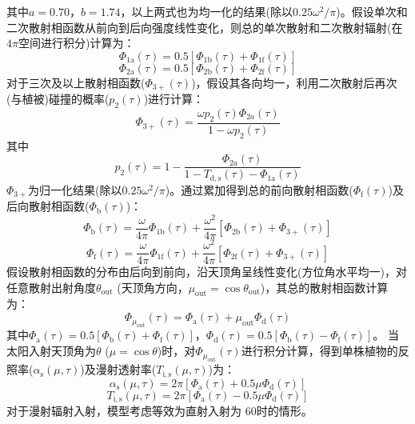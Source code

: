 其中$a=0.70$，$b=1.74$，以上两式也为均一化的结果(除以$0.25\omega^2/\pi$)。假设单次和二次散射相函数从前向到后向强度线性变化，则总的单次散射和二次散射辐射(在$4\pi$空间进行积分)计算为：
\begin{equation}
  \Phi_{\mathrm{1 a}}(\tau)=0.5\left[\Phi_{\mathrm{1 b}}(\tau)+\Phi_{\mathrm{1 f}}(\tau)\right]
\end{equation}
\begin{equation}
  \Phi_{\mathrm{2 a}}(\tau)=0.5\left[\Phi_{\mathrm{2 b}}(\tau)+\Phi_{\mathrm{2 f}}(\tau)\right]
\end{equation}
对于三次及以上散射相函数($\Phi_{3+}\left(\tau\right)$)，假设其各向均一，利用二次散射后再次(与植被)碰撞的概率($p_2\left(\tau\right)$)进行计算：
\begin{equation}
  \Phi_{3+}(\tau)=\frac{\omega p_{2}(\tau) \Phi_{2 a}(\tau)}{1-\omega p_{2}(\tau)}
\end{equation}
其中
\begin{equation}
  p_{2}(\tau)=1-\frac{\Phi_{2 a}(\tau)}{1-T_{\mathrm{d, s}}(\tau)-\Phi_{\mathrm{1 a}}(\tau)}
\end{equation}
$\Phi_{3+}$为归一化结果(除以$0.25\omega^2/\pi$)。通过累加得到总的前向散射相函数($\Phi_{\mathrm {f}}\left(\tau\right)$)及后向散射相函数($\Phi_{\mathrm {b}}\left(\tau\right)$)：
\begin{equation}
  \Phi_{\mathrm{b}}(\tau)=\frac{\omega}{4 \pi} \Phi_{\mathrm{1 b}}(\tau)+\frac{\omega^{2}}{4 \pi}\left[\Phi_{\mathrm{2 b}}(\tau)+\Phi_{3+}(\tau)\right]
\end{equation}
\begin{equation}
  \Phi_{\mathrm{f}}(\tau)=\frac{\omega}{4 \pi} \Phi_{\mathrm{1 f}}(\tau)+\frac{\omega^{2}}{4 \pi}\left[\Phi_{\mathrm{2 f}}(\tau)+\Phi_{3+}(\tau)\right]
\end{equation}
假设散射相函数的分布由后向到前向，沿天顶角呈线性变化(方位角水平均一)，对任意散射出射角度$\theta_{\mathrm{out}}$ (天顶角方向，$\mu_{\mathrm{out}}=\cos{\theta_{\mathrm{out}}}$)，其总的散射相函数计算为：
\begin{equation}
  \Phi_{\mu_{\mathrm{out}}}(\tau)=\Phi_{\mathrm{a}}(\tau)+\mu_{\mathrm{out}} \Phi_{\mathrm{d}}(\tau)
\end{equation}
其中$\Phi_{\mathrm a}\left(\tau\right)=0.5\left[\Phi_{\mathrm {b}}\left(\tau\right)+\Phi_{\mathrm {f}}\left(\tau\right)\right]$，$\Phi_{\mathrm d}\left(\tau\right)=0.5\left[\Phi_{\mathrm {b}}\left(\tau\right)-\Phi_{\mathrm {f}}\left(\tau\right)\right]$。
当太阳入射天顶角为$\theta$ ($\mu=\cos{\theta}$)时，对$\Phi_{\mu_{\mathrm{out}}}\left(\tau\right)$进行积分计算，得到单株植物的反照率($\alpha_{\mathrm s}\left(\mu,\tau\right)$)及漫射透射率($T_{\mathrm{i,s}}\left(\mu,\tau\right)$)为：
\begin{equation}
  \alpha_{\mathrm{s}}(\mu, \tau)=2 \pi\left[\Phi_{\mathrm{a}}(\tau)+0.5 \mu \Phi_{\mathrm{d}}(\tau)\right]
\end{equation}
\begin{equation}
  T_{\mathrm{i, s}}(\mu, \tau)=2 \pi\left[\Phi_{\mathrm{a}}(\tau)-0.5 \mu \Phi_{\mathrm{d}}(\tau)\right]
\end{equation}
对于漫射辐射入射，模型考虑等效为直射入射为 60\textdegree 时的情形。


